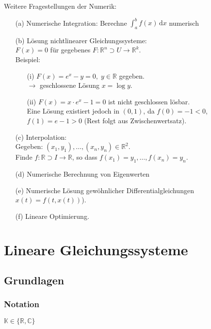 \documentclass[11pt]{scrartcl}
\renewcommand{\d}{\,\mathrm d}
\newcommand*{\RR}{\mathbb R}
\theoremstyle{break}
\theoremstyle{remark}
\begin{document}
Weitere Fragestellungen der Numerik:
\begin{enumerate}
\item[(a)]
Numerische Integration: Berechne $\int_a^b f(x) \d x$ numerisch
\item[(b)]
Lösung nichtlinearer Gleichungssysteme: \\
$F(x) = 0$ für gegebenes $F\colon \RR^n \supset U \rightarrow \mathbb{R}^k$. \\
Beispiel:
\begin{enumerate}
\item[(i)]
$F(x)=e^x-y = 0,\; y \in \mathbb{R}$ gegeben. \\
$\rightarrow$ geschlossene Lösung $x = \log y.$
\item[(ii)]
$F(x)=x \cdot e^x -1 = 0$ ist nicht geschlossen lösbar. \\
Eine Lösung existiert jedoch in $(0,1)$, da $f(0) = -1 < 0$, \\
$f(1)= e-1>0 $ (Rest folgt aus Zwischenwertsatz).
\end{enumerate}
\item[(c)]
Interpolation: \\
Gegeben: $(x_1,y_1), \dots, (x_n,y_n) \in \mathbb{R}^2$. \\
Finde $f: \RR \supset I \to \RR$, so dass 
$f(x_1) = y_1, \dots , f(x_n)=y_n$.
\item[(d)]
Numerische Berechnung von Eigenwerten
\item[(e)]
Numerische Lösung gewöhnlicher Differentialgleichungen $x(t)=f(t,x(t))$).
\item[(f)]
Lineare Optimierung.
\end{enumerate}

\newpage
\section{Lineare Gleichungssysteme}

\subsection{Grundlagen}

\subsubsection{Notation}

$\mathbb{K} \in \{\mathbb{R}, \mathbb{C}\}$ \\
\end{document}

